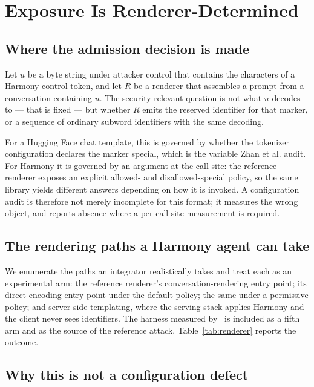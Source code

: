 \documentclass[conference]{IEEEtran}
\begin{document}
\section{Exposure Is Renderer-Determined}
\label{sec:renderer}

\subsection{Where the admission decision is made}

Let $u$ be a byte string under attacker control that contains the characters of
a Harmony control token, and let $R$ be a renderer that assembles a prompt from
a conversation containing $u$. The security-relevant question is not what $u$
decodes to --- that is fixed --- but whether $R$ emits the reserved identifier
for that marker, or a sequence of ordinary subword identifiers with the same
decoding.

For a Hugging Face chat template, this is governed by whether the tokenizer
configuration declares the marker special, which is the variable Zhan et al.
audit. For Harmony it is governed by an argument at the call site: the reference
renderer exposes an explicit allowed- and disallowed-special policy, so the same
library yields different answers depending on how it is invoked. A configuration
audit is therefore not merely incomplete for this format; it measures the wrong
object, and reports absence where a per-call-site measurement is required.

\subsection{The rendering paths a Harmony agent can take}

We enumerate the paths an integrator realistically takes and treat each as an
experimental arm: the reference renderer's conversation-rendering entry point;
its direct encoding entry point under the default policy; the same under a
permissive policy; and server-side templating, where the serving stack applies
Harmony and the client never sees identifiers. The harness measured
by~\cite{usama2026controltoken} is included as a fifth arm and as the source of
the reference attack. Table~\ref{tab:renderer} reports the outcome.

\subsection{Why this is not a configuration defect}
\end{document}

